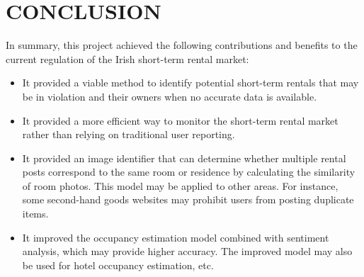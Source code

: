 \documentclass[conference, compsoc]{IEEEtran}
\begin{document}
\section{CONCLUSION}
In summary, this project achieved the following contributions and benefits to the current regulation of the Irish short-term rental market:
\begin{itemize}
    \item
    It provided a viable method to identify potential short-term rentals that may be in violation and their owners when no accurate data is available.

    \item
    It provided a more efficient way to monitor the short-term rental market rather than relying on traditional user reporting.

    \item
    It provided an image identifier that can determine whether multiple rental posts correspond to the same room or residence by calculating the similarity of room photos.
    This model may be applied to other areas.
    For instance, some second-hand goods websites may prohibit users from posting duplicate items.

    \item
    It improved the occupancy estimation model combined with sentiment analysis, which may provide higher accuracy.
    The improved model may also be used for hotel occupancy estimation, etc.
\end{itemize}



\end{document}
